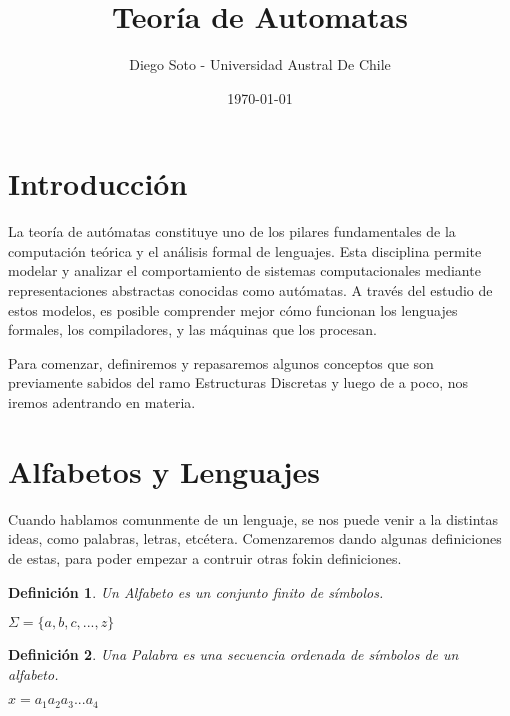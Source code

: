 \documentclass[12pt]{article}
\newtheorem{definicion}{Definición}
\begin{document}
\title{Teoría de Automatas}
\author{Diego Soto - Universidad Austral De Chile}
\date{\today}
\maketitle

\newpage %
\tableofcontents
\newpage

\section{Introducción}

La teoría de autómatas constituye uno de los pilares fundamentales de la computación teórica y el análisis formal de lenguajes. Esta disciplina permite modelar y analizar el comportamiento de sistemas computacionales mediante representaciones abstractas conocidas como autómatas. A través del estudio de estos modelos, es posible comprender mejor cómo funcionan los lenguajes formales, los compiladores, y las máquinas que los procesan. 

Para comenzar, definiremos y repasaremos algunos conceptos que son previamente sabidos del ramo Estructuras Discretas y luego de a poco, nos iremos adentrando en materia.

\section{Alfabetos y Lenguajes}

Cuando hablamos comunmente de un lenguaje, se nos puede venir a la distintas ideas, como palabras, letras, etcétera. 
Comenzaremos dando algunas definiciones de estas, para poder empezar a contruir otras fokin definiciones.

\begin{definicion}
  Un Alfabeto es un conjunto finito de símbolos. \begin{center} $\Sigma = \{a, b, c, ..., z\}$\end{center}
\end{definicion}

\begin{definicion}
  Una Palabra es una secuencia ordenada de símbolos de un alfabeto. \par \begin{center} $x = a_1a_2a_3...a_4$ \end{center}
\end{definicion}
\end{document}

